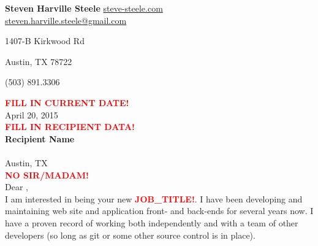 \documentclass[11pt]{ncsuthesis4}
\begin{document}
\oddsidemargin 0.25in
\evensidemargin 0.25in
\textwidth 6.0in
\topmargin 0.25in
\textheight 8.0in
\renewcommand{\baselinestretch}{2}
\renewcommand{\headrulewidth}{0pt}
\thispagestyle{empty}
\rhead{\thepage}
\setlength{\headsep}{0in}
\setlength{\parindent}{2em}




\noindent \textbf{\Large Steven Harville Steele} \hfill \textcolor{blue}{\href{http://www.steve-steele.com}{steve-steele.com}}
\\

\hfill \href{mailto:steven.harville.steele@gmail.com}{steven.harville.steele@gmail.com}

\hfill 1407-B Kirkwood Rd

\hfill Austin, TX  78722

\hfill (503) 891.3306

\noindent \textcolor{red}{\textbf{FILL IN CURRENT DATE!}}\\
\noindent April 20, 2015\\%

\noindent \textcolor{red}{\textbf{FILL IN RECIPIENT DATA!}}\\
\noindent \textbf{Recipient Name}\\%
\noindent \\%
\noindent Austin, TX  \\%

\noindent \textcolor{red}{\textbf{NO SIR/MADAM!}}\\
\noindent Dear ,
\\




\noindent
I am interested in being your new \textcolor{red}{\textbf{JOB_TITLE!}}. I have been developing and maintaining web site and application front- and back-ends for several years now. I have a proven record of working both independently and with a team of other developers (so long as git or some other source control is in place).
\\
\end{document}
